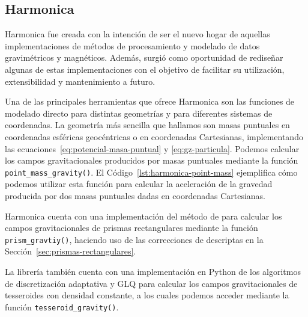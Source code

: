 \subsection{Harmonica}
\label{sec:harmonica}

Harmonica fue creada con la intención de ser el nuevo hogar de aquellas
implementaciones de métodos de procesamiento y modelado de datos gravimétricos
y magnéticos.
Además, surgió como oportunidad de rediseñar algunas de estas implementaciones
con el objetivo de facilitar su utilización, extensibilidad y mantenimiento
a futuro.

Una de las principales herramientas que ofrece Harmonica son las
funciones de modelado directo para distintas geometrías y para diferentes
sistemas de coordenadas.
La geometría más sencilla que hallamos son masas puntuales en coordenadas
esféricas geocéntricas o en coordenadas Cartesianas, implementando las
ecuaciones~\ref{eq:potencial-masa-puntual} y \ref{eq:gz-particula}.
Podemos calcular los campos gravitacionales producidos por masas puntuales
mediante la función \texttt{point\_mass\_gravity()}.
El Código~\ref{lst:harmonica-point-mass} ejemplifica cómo podemos utilizar esta
función para calcular la aceleración de la gravedad producida por dos masas
puntuales dadas en coordenadas Cartesianas.

Harmonica cuenta con una implementación del método de \citet{nagy2000} para
calcular los campos gravitacionales de prismas rectangulares mediante la
función \texttt{prism\_gravtiy()}, haciendo uso de las correcciones de
\citet{fukushima2020} descriptas en la Sección~\ref{sec:prismas-rectangulares}.

La librería también cuenta con una implementación en Python de los algoritmos
de discretización adaptativa y \ac{GLQ} para calcular los campos
gravitacionales de tesseroides con densidad constante, a los cuales podemos
acceder mediante la función \texttt{tesseroid\_gravity()}.



